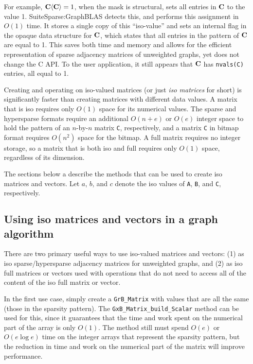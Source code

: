 \documentclass[12pt]{article}
\begin{document}
For example, ${\bf C \langle C \rangle} = 1$, when the mask is structural, sets
all entries in $\bf C$ to the value 1.  SuiteSparse:GraphBLAS detects this, and
performs this assignment in $O(1)$ time.  It stores a single copy of this
``iso-value'' and sets an internal flag in the opaque data structure for $\bf
C$, which states that all entries in the pattern of $\bf C$ are equal to 1.
This saves both time and memory and allows for the efficient representation of
sparse adjacency matrices of unweighted graphs, yet does not change the C API.
To the user application, it still appears that $\bf C$ has \verb'nvals(C)'
entries, all equal to 1.

Creating and operating on iso-valued matrices (or just {\em iso matrices} for 
short) is significantly faster than creating matrices with different data
values.  A matrix that is iso requires only $O(1)$ space for its numerical
values.  The sparse and hypersparse formats require an additional $O(n+e)$ or
$O(e)$ integer space to hold the pattern of an $n$-by-$n$ matrix \verb'C',
respectively, and a matrix \verb'C' in bitmap format requires $O(n^2)$ space
for the bitmap.  A full matrix requires no integer storage, so a matrix that is
both iso and full requires only $O(1)$ space, regardless of its dimension.

The sections below a describe the methods that can be used to create iso
matrices and vectors.  Let $a$, $b$, and $c$ denote the iso values of \verb'A',
\verb'B', and \verb'C', respectively.

\subsection{Using iso matrices and vectors in a graph algorithm}
\label{iso_usage}

There are two primary useful ways to use iso-valued matrices and vectors: (1)
as iso sparse/hypersparse adjacency matrices for unweighted graphs, and (2) as
iso full matrices or vectors used with operations that do not need to access
all of the content of the iso full matrix or vector.

In the first use case, simply create a \verb'GrB_Matrix' with values that are
all the same (those in the sparsity pattern).  The
\verb'GxB_Matrix_build_Scalar' method can be used for this, since it
guarantees that the time and work spent on the numerical part of the array
is only $O(1)$.  The method still must spend $O(e)$ or $O(e \log e)$ time
on the integer arrays that represent the sparsity pattern, but the reduction
in time and work on the numerical part of the matrix will improve performance.
\end{document}
